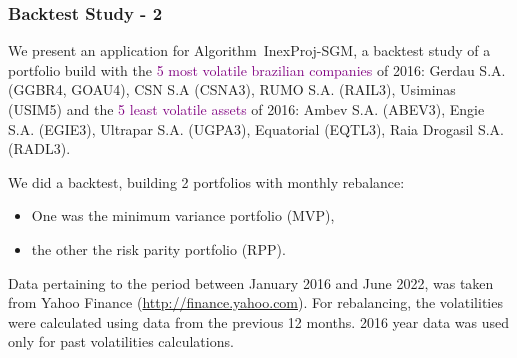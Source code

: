 \begin{frame}[t]\frametitle{Backtest Study - 2}\bigskip
	We present an application for Algorithm~InexProj-SGM, a backtest study of a portfolio build with the \textcolor{purple}{5 most volatile brazilian companies} of 2016: Gerdau S.A. (GGBR4, GOAU4), CSN S.A (CSNA3), RUMO S.A. (RAIL3), Usiminas (USIM5) and the \textcolor{purple}{5 least volatile assets} of 2016: Ambev S.A. (ABEV3), Engie S.A. (EGIE3), Ultrapar S.A. (UGPA3), Equatorial (EQTL3), Raia Drogasil S.A. (RADL3).

	 We did a backtest, building 2 portfolios with monthly rebalance:
	 \begin{itemize}
	 	\item One was the minimum variance portfolio (MVP), 
	 	\item the other the risk parity portfolio (RPP).
	 \end{itemize}

	 Data pertaining to the period between January 2016  and June 2022, was taken from Yahoo Finance (\url{http://finance.yahoo.com}). For rebalancing, the volatilities were calculated using data from the previous 12 months. 2016 year data was used only for past volatilities calculations.
\end{frame}



